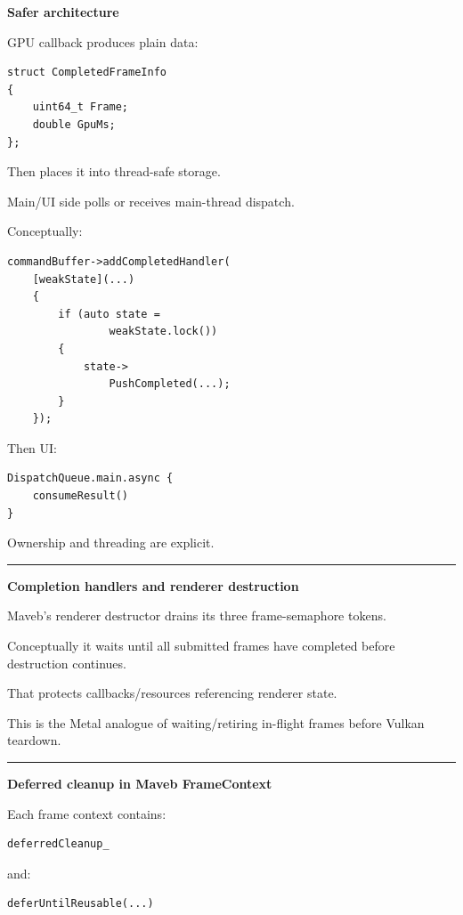 \textbf{Safer architecture}

GPU callback produces plain data:

\begin{verbatim}
struct CompletedFrameInfo
{
    uint64_t Frame;
    double GpuMs;
};
\end{verbatim}

Then places it into thread-safe storage.

Main/UI side polls or receives main-thread dispatch.

Conceptually:

\begin{verbatim}
commandBuffer->addCompletedHandler(
    [weakState](...)
    {
        if (auto state =
                weakState.lock())
        {
            state->
                PushCompleted(...);
        }
    });
\end{verbatim}

Then UI:

\begin{verbatim}
DispatchQueue.main.async {
    consumeResult()
}
\end{verbatim}

Ownership and threading are explicit.

\begin{center}\rule{0.5\linewidth}{0.5pt}\end{center}

\textbf{Completion handlers and renderer destruction}

Maveb's renderer destructor drains its three frame-semaphore tokens.

Conceptually it waits until all submitted frames have completed before destruction continues.

That protects callbacks/resources referencing renderer state.

This is the Metal analogue of waiting/retiring in-flight frames before Vulkan teardown.

\begin{center}\rule{0.5\linewidth}{0.5pt}\end{center}

\textbf{Deferred cleanup in Maveb FrameContext}

Each frame context contains:

\begin{verbatim}
deferredCleanup_
\end{verbatim}

and:

\begin{verbatim}
deferUntilReusable(...)
\end{verbatim}


